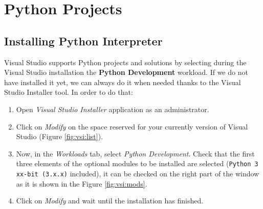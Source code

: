 \chapter{Python Projects} \label{sec:Python}

    \FloatBarrier
    \section{Installing Python Interpreter}

Visual Studio supports Python projects and solutions by selecting during the Visual Studio installation the \textbf{Python Development} workload. If we do not have installed it yet, we can always do it when needed thanks to the Visual Studio Installer tool. In order to do that:

\begin{enumerate}
	\item Open \textit{Visual Studio Installer} application as an administrator.
	\item Click on \textit{Modify} on the space reserved for your currently version of Visual Studio (Figure \ref{fig:vsi:list}). %
	\item Now, in the \textit{Workloads} tab, select \textit{Python Development}. Check that the first three elements of the optional modules to be installed are selected (\texttt{Python 3 xx-bit (3.x.x)} included), it can be checked on the right part of the window as it is shown in the Figure \ref{fig:vsi:mods}.
	\item Click on \textit{Modify} and wait until the installation has finished.
\end{enumerate} 



